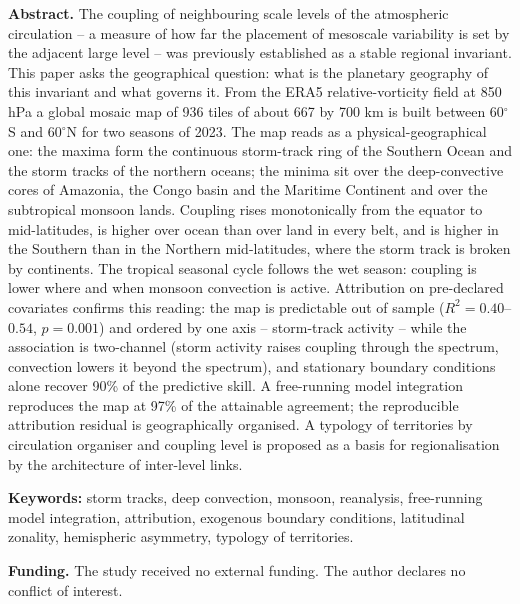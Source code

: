 \documentclass[12pt,a4paper]{article}
\begin{document}
\begin{singlespace}
\noindent\textbf{Abstract.} The coupling of neighbouring scale levels of the atmospheric circulation -- a measure of how far the placement of mesoscale variability is set by the adjacent large level -- was previously established as a stable regional invariant. This paper asks the geographical question: what is the planetary geography of this invariant and what governs it. From the ERA5 relative-vorticity field at 850 hPa a global mosaic map of 936 tiles of about 667 by 700 km is built between 60$^\circ$S and 60$^\circ$N for two seasons of 2023. The map reads as a physical-geographical one: the maxima form the continuous storm-track ring of the Southern Ocean and the storm tracks of the northern oceans; the minima sit over the deep-convective cores of Amazonia, the Congo basin and the Maritime Continent and over the subtropical monsoon lands. Coupling rises monotonically from the equator to mid-latitudes, is higher over ocean than over land in every belt, and is higher in the Southern than in the Northern mid-latitudes, where the storm track is broken by continents. The tropical seasonal cycle follows the wet season: coupling is lower where and when monsoon convection is active. Attribution on pre-declared covariates confirms this reading: the map is predictable out of sample ($R^2 = 0.40$--$0.54$, $p = 0.001$) and ordered by one axis -- storm-track activity -- while the association is two-channel (storm activity raises coupling through the spectrum, convection lowers it beyond the spectrum), and stationary boundary conditions alone recover 90\% of the predictive skill. A free-running model integration reproduces the map at 97\% of the attainable agreement; the reproducible attribution residual is geographically organised. A typology of territories by circulation organiser and coupling level is proposed as a basis for regionalisation by the architecture of inter-level links.

\smallskip
\noindent\textbf{Keywords:} storm tracks, deep convection, monsoon, reanalysis, free-running model integration, attribution, exogenous boundary conditions, latitudinal zonality, hemispheric asymmetry, typology of territories.

\smallskip
\noindent\textbf{Funding.} The study received no external funding. The author declares no conflict of interest.
\end{singlespace}
\end{document}
